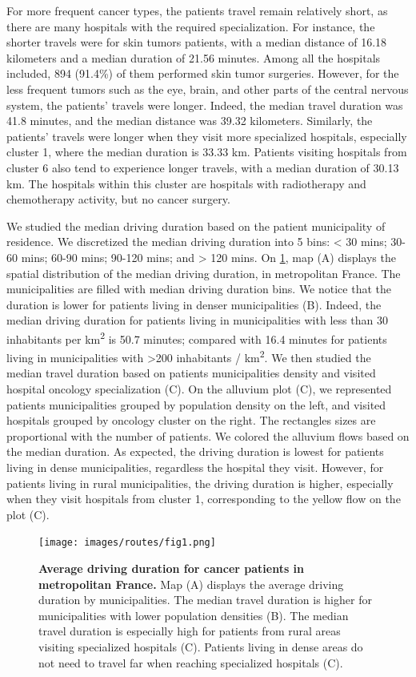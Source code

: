 For more frequent cancer types, the patients travel remain relatively short, as
there are many hospitals with the required specialization. For instance, the
shorter travels were for skin tumors patients, with a median distance of 16.18
kilometers and a median duration of 21.56 minutes. Among all the hospitals
included, 894 (91.4\%) of them performed skin tumor surgeries. However, for the
less frequent tumors such as the eye, brain, and other parts of the central
nervous system, the patients' travels were longer. Indeed, the median travel
duration was 41.8 minutes, and the median distance was 39.32 kilometers.
Similarly, the patients' travels were longer when they visit more specialized
hospitals, especially cluster 1, where the median duration is 33.33 km. Patients
visiting hospitals from cluster 6 also tend to experience longer travels, with a
median duration of 30.13 km. The hospitals within this cluster are hospitals
with radiotherapy and chemotherapy activity, but no cancer surgery.

We studied the median driving duration based on the patient municipality of
residence. We discretized the median driving duration into 5 bins: < 30 mins;
30-60 mins; 60-90 mins; 90-120 mins; and > 120 mins. On
\cref{fig:routes-duration-france}, map (A) displays the spatial distribution
of the median driving duration, in metropolitan France. The municipalities
are filled with median driving duration bins. We notice that the duration is
lower for patients living in denser municipalities (B). Indeed, the median
driving duration for patients living in municipalities with less than 30
inhabitants per km\textsuperscript{2} is 50.7 minutes; compared with
16.4 minutes for patients living in municipalities with
>200 inhabitants / km\textsuperscript{2}. We then studied the median travel
duration based on patients municipalities density and visited hospital oncology
specialization (C). On the alluvium plot (C), we represented patients
municipalities grouped by population density on the left, and visited hospitals
grouped by oncology cluster on the right. The rectangles sizes are proportional
with the number of patients. We colored the alluvium flows based on the median
duration. As expected, the driving duration is lowest for patients living in
dense municipalities, regardless the hospital they visit. However, for patients
living in rural municipalities, the driving duration is higher, especially when
they visit hospitals from cluster 1, corresponding to the yellow flow on the
plot (C).

\begin{figure}[h!]
    \texttt{[image: images/routes/fig1.png]}
    \centering
    \caption{ \textbf{Average driving duration for cancer patients in
            metropolitan France.} Map (A) displays the average driving duration by
        municipalities. The median travel duration is higher for municipalities
        with lower population densities (B). The median travel duration is
        especially high for patients from rural areas visiting specialized
        hospitals (C). Patients living in dense areas do not need to travel far
        when reaching specialized hospitals (C). }
    \label{fig:routes-duration-france}
\end{figure}


